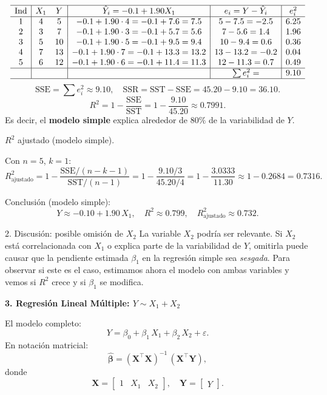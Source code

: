 \documentclass[10pt,a4paper]{article}
\begin{document}
\begin{enumerate}
{\[
\begin{array}{c|cc|c|c|c}
\hline
\text{Ind} & X_1 & Y 
& \hat{Y}_i = -0.1 +1.90X_1
& e_i= Y-\hat{Y}_i
& e_i^2
\\\hline
1 & 4 & 5 
& -0.1 +1.90\cdot4 =-0.1 +7.6=7.5
& 5-7.5=-2.5
& 6.25
\\
2 & 3 &7
& -0.1 +1.90\cdot3 =-0.1 +5.7=5.6
& 7-5.6=1.4
& 1.96
\\
3 & 5 &10
& -0.1 +1.90\cdot5 =-0.1 +9.5=9.4
& 10-9.4=0.6
& 0.36
\\
4 & 7 &13
& -0.1 +1.90\cdot7 =-0.1 +13.3=13.2
& 13-13.2=-0.2
& 0.04
\\
5 & 6 &12
& -0.1 +1.90\cdot6 =-0.1 +11.4=11.3
& 12-11.3=0.7
& 0.49
\\
\hline
& & & & \sum e_i^2= & 9.10
\\\hline
\end{array}
\]
\[
\text{SSE} = \sum e_i^2 \approx 9.10,
\quad
\text{SSR} = \text{SST} - \text{SSE} = 45.20 -9.10=36.10.
\]
\[
R^2
= 1 - \frac{\text{SSE}}{\text{SST}}
= 1 - \frac{9.10}{45.20}
\approx 0.7991.
\]
Es decir, el \textbf{modelo simple} explica alrededor de $80\%$ de la variabilidad de $Y$.

$R^2$ ajustado (modelo simple).

Con $n=5$, $k=1$:
\[
R_{\text{ajustado}}^2
= 1 - \frac{\text{SSE}/(n - k -1)}{\text{SST}/(n-1)}
= 1 - \frac{9.10/3}{45.20/4}
= 1 - \frac{3.0333}{11.30}
\approx 1 -0.2684
= 0.7316.
\]

{Conclusi\'on (modelo simple):}
\[
Y \approx -0.10 +1.90\,X_1,
\quad
R^2 \approx 0.799,
\quad
R_{\text{ajustado}}^2 \approx 0.732.
\]
}
{{2. Discusi\'on: posible omisi\'on de $X_2$}
La variable $X_2$ podr\'ia ser relevante. Si $X_2$ est\'a correlacionada con $X_1$ o explica parte de la variabilidad de $Y$, omitirla puede causar que la pendiente estimada $\beta_1$ en la regresión simple sea \emph{sesgada}. Para observar si este es el caso, estimamos ahora el modelo con ambas variables y vemos si $R^2$ crece y si $\beta_1$ se modifica.}

\textbf{3. Regresi\'on Lineal M\'ultiple: $Y \sim X_1 + X_2$}

El modelo completo:
\[
Y = \beta_0 + \beta_1\,X_1 + \beta_2\,X_2 + \varepsilon.
\]
En notaci\'on matricial:
\[
\hat{\boldsymbol{\beta}}
= (\mathbf{X}^\top \mathbf{X})^{-1} \, (\mathbf{X}^\top \mathbf{Y}),
\]
donde
\[
\mathbf{X}
=
\begin{bmatrix}
1 & X_1 & X_2
\end{bmatrix},
\quad
\mathbf{Y}
=
\begin{bmatrix}
Y
\end{bmatrix}.
\]



\end{enumerate}
\end{document}
